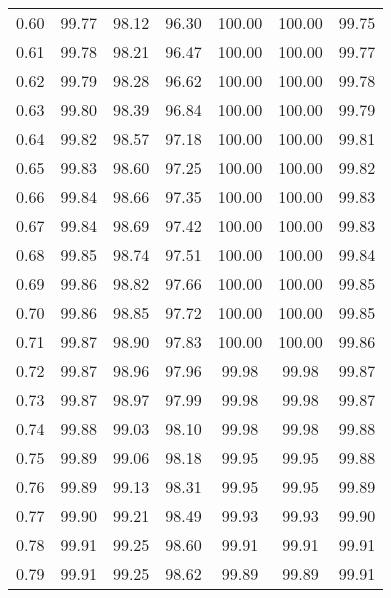 \begin{tabular}{|c|c|c|c|c|c|c|}
      0.60 &     99.77 &     98.12 &      96.30 &  100.00 &     100.00 &         99.75 \\
      0.61 &     99.78 &     98.21 &      96.47 &  100.00 &     100.00 &         99.77 \\
      0.62 &     99.79 &     98.28 &      96.62 &  100.00 &     100.00 &         99.78 \\
      0.63 &     99.80 &     98.39 &      96.84 &  100.00 &     100.00 &         99.79 \\
      0.64 &     99.82 &     98.57 &      97.18 &  100.00 &     100.00 &         99.81 \\
      0.65 &     99.83 &     98.60 &      97.25 &  100.00 &     100.00 &         99.82 \\
      0.66 &     99.84 &     98.66 &      97.35 &  100.00 &     100.00 &         99.83 \\
      0.67 &     99.84 &     98.69 &      97.42 &  100.00 &     100.00 &         99.83 \\
      0.68 &     99.85 &     98.74 &      97.51 &  100.00 &     100.00 &         99.84 \\
      0.69 &     99.86 &     98.82 &      97.66 &  100.00 &     100.00 &         99.85 \\
      0.70 &     99.86 &     98.85 &      97.72 &  100.00 &     100.00 &         99.85 \\
      0.71 &     99.87 &     98.90 &      97.83 &  100.00 &     100.00 &         99.86 \\
      0.72 &     99.87 &     98.96 &      97.96 &   99.98 &      99.98 &         99.87 \\
      0.73 &     99.87 &     98.97 &      97.99 &   99.98 &      99.98 &         99.87 \\
      0.74 &     99.88 &     99.03 &      98.10 &   99.98 &      99.98 &         99.88 \\
      0.75 &     99.89 &     99.06 &      98.18 &   99.95 &      99.95 &         99.88 \\
      0.76 &     99.89 &     99.13 &      98.31 &   99.95 &      99.95 &         99.89 \\
      0.77 &     99.90 &     99.21 &      98.49 &   99.93 &      99.93 &         99.90 \\
      0.78 &     99.91 &     99.25 &      98.60 &   99.91 &      99.91 &         99.91 \\
      0.79 &     99.91 &     99.25 &      98.62 &   99.89 &      99.89 &         99.91 \\

\end{tabular}
